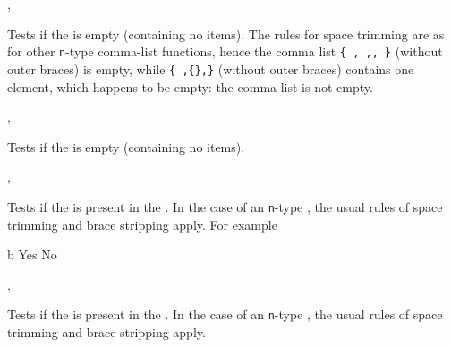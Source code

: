 \documentclass[oneside]{book}
\begin{document}
\begin{function}{\ClistIfEmpty,\ClistIfEmptyTF}
\begin{syntax}
 
   
\end{syntax}
Tests if the  is empty (containing no items).
The rules for space trimming are as for other \texttt{n}-type
comma-list functions, hence the comma list \verb|{ , ,, }| (without
outer braces) is empty, while \verb|{ ,{},}| (without outer braces)
contains one element, which happens to be empty: the comma-list
is not empty.
\end{function}

\begin{function}{\ClistVarIfEmpty,\ClistVarIfEmptyTF}
\begin{syntax}
 
   
\end{syntax}
Tests if the  is empty (containing no items).
\end{function}
 
\begin{function}{\ClistIfIn,\ClistIfInTF}
\begin{syntax}
  
    
\end{syntax}
Tests if the  is present in the .
In the case of an \texttt{n}-type , the usual rules
of space trimming and brace stripping apply. For example
\begin{demohigh}
 {b} {Yes} {No}
\end{demohigh}
\end{function}

\begin{function}{\ClistVarIfIn,\ClistVarIfInTF}
\begin{syntax}
  
    
\end{syntax}
Tests if the  is present in the .
In the case of an \texttt{n}-type , the usual rules
of space trimming and brace stripping apply.
\end{function}
\end{document}
